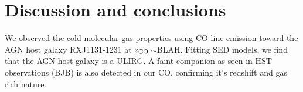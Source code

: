 


\section{Discussion and conclusions}
We observed the cold molecular gas properties using CO line emission toward the AGN host galaxy RXJ1131-1231 at 
$z_{\rm CO}$\,$\sim$BLAH. 
Fitting SED models, we find that the AGN host galaxy is a ULIRG. 
A faint companion as seen in HST observations (BJB) is also detected in our CO, confirming it's redshift and gas rich nature.
